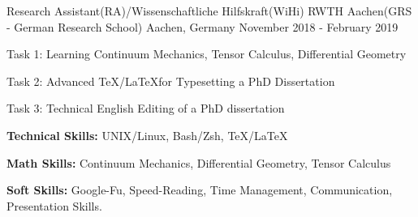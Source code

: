 \begin{cventries}
  \cventry
    {Research Assistant(RA)/Wissenschaftliche Hilfskraft(WiHi)} %
    {RWTH Aachen(GRS - German Research School)} %
    {Aachen, Germany} %
    {November 2018 - February 2019} %
    {
      \begin{cvitems} %
      \item {Task 1: Learning Continuum Mechanics, Tensor Calculus, Differential Geometry}
      \item {Task 2: Advanced \TeX/\LaTeX for Typesetting a PhD Dissertation}
      \item {Task 3: Technical English Editing of a PhD dissertation}
      \item {\textbf{Technical Skills:} UNIX/Linux, Bash/Zsh, \TeX/\LaTeX}
      \item {\textbf{Math Skills:} Continuum Mechanics, Differential Geometry, Tensor Calculus}
      \item {\textbf{Soft Skills:} Google-Fu, Speed-Reading, Time Management, Communication, Presentation Skills.}
      \end{cvitems}
    }



\end{cventries}
